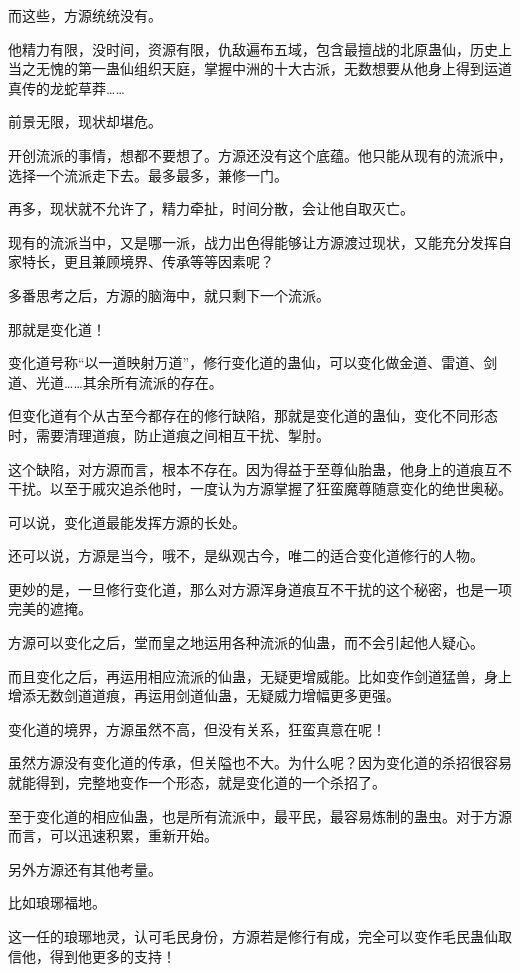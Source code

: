 \begin{this_body}
而这些，方源统统没有。

他精力有限，没时间，资源有限，仇敌遍布五域，包含最擅战的北原蛊仙，历史上当之无愧的第一蛊仙组织天庭，掌握中洲的十大古派，无数想要从他身上得到运道真传的龙蛇草莽……

前景无限，现状却堪危。

开创流派的事情，想都不要想了。方源还没有这个底蕴。他只能从现有的流派中，选择一个流派走下去。最多最多，兼修一门。

再多，现状就不允许了，精力牵扯，时间分散，会让他自取灭亡。

现有的流派当中，又是哪一派，战力出色得能够让方源渡过现状，又能充分发挥自家特长，更且兼顾境界、传承等等因素呢？

多番思考之后，方源的脑海中，就只剩下一个流派。

那就是变化道！

变化道号称“以一道映射万道”，修行变化道的蛊仙，可以变化做金道、雷道、剑道、光道……其余所有流派的存在。

但变化道有个从古至今都存在的修行缺陷，那就是变化道的蛊仙，变化不同形态时，需要清理道痕，防止道痕之间相互干扰、掣肘。

这个缺陷，对方源而言，根本不存在。因为得益于至尊仙胎蛊，他身上的道痕互不干扰。以至于戚灾追杀他时，一度认为方源掌握了狂蛮魔尊随意变化的绝世奥秘。

可以说，变化道最能发挥方源的长处。

还可以说，方源是当今，哦不，是纵观古今，唯二的适合变化道修行的人物。

更妙的是，一旦修行变化道，那么对方源浑身道痕互不干扰的这个秘密，也是一项完美的遮掩。

方源可以变化之后，堂而皇之地运用各种流派的仙蛊，而不会引起他人疑心。

而且变化之后，再运用相应流派的仙蛊，无疑更增威能。比如变作剑道猛兽，身上增添无数剑道道痕，再运用剑道仙蛊，无疑威力增幅更多更强。

变化道的境界，方源虽然不高，但没有关系，狂蛮真意在呢！

虽然方源没有变化道的传承，但关隘也不大。为什么呢？因为变化道的杀招很容易就能得到，完整地变作一个形态，就是变化道的一个杀招了。

至于变化道的相应仙蛊，也是所有流派中，最平民，最容易炼制的蛊虫。对于方源而言，可以迅速积累，重新开始。

另外方源还有其他考量。

比如琅琊福地。

这一任的琅琊地灵，认可毛民身份，方源若是修行有成，完全可以变作毛民蛊仙取信他，得到他更多的支持！


\end{this_body}
